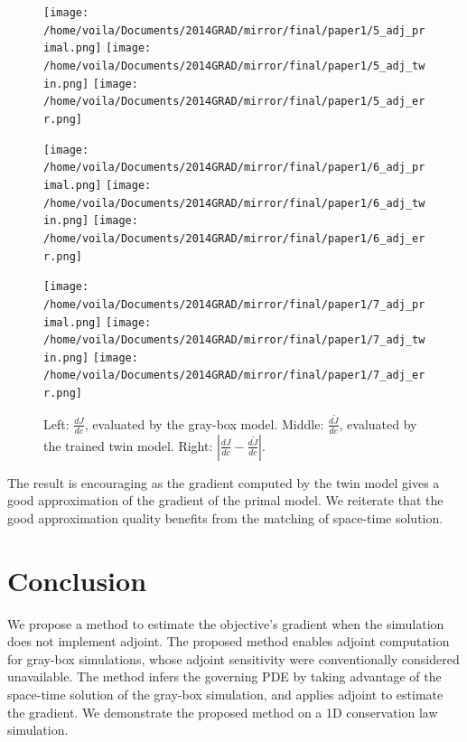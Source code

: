 \documentclass[a4paper,onecolumn]{article}
\theoremstyle{remark}
\begin{document}
\vspace{-1cm}
\begin{figure}[H]\begin{center}
    \texttt{[image: /home/voila/Documents/2014GRAD/mirror/final/paper1/5\_adj\_primal.png]}
    \texttt{[image: /home/voila/Documents/2014GRAD/mirror/final/paper1/5\_adj\_twin.png]}
    \texttt{[image: /home/voila/Documents/2014GRAD/mirror/final/paper1/5\_adj\_err.png]}
    \label{fig:sol compare}
\end{center}\end{figure}
\vspace{-1cm}
\begin{figure}[H]\begin{center}
    \texttt{[image: /home/voila/Documents/2014GRAD/mirror/final/paper1/6\_adj\_primal.png]}
    \texttt{[image: /home/voila/Documents/2014GRAD/mirror/final/paper1/6\_adj\_twin.png]}
    \texttt{[image: /home/voila/Documents/2014GRAD/mirror/final/paper1/6\_adj\_err.png]}
    \label{fig:sol compare}
\end{center}\end{figure}
\vspace{-1cm}
\begin{figure}[H]\begin{center}
    \texttt{[image: /home/voila/Documents/2014GRAD/mirror/final/paper1/7\_adj\_primal.png]}
    \texttt{[image: /home/voila/Documents/2014GRAD/mirror/final/paper1/7\_adj\_twin.png]}
    \texttt{[image: /home/voila/Documents/2014GRAD/mirror/final/paper1/7\_adj\_err.png]}
    \label{fig:sol compare}
    \caption{Left: $\frac{dJ}{dc}$, evaluated by the gray-box model. 
             Middle: $\frac{d\tilde{J}}{dc}$, evaluated by the trained twin model.
             Right: $\left|\frac{dJ}{dc} - \frac{d\tilde{J}}{dc}\right|$.}
\end{center}\end{figure}


The result is encouraging as the gradient computed by the twin model gives a good approximation
of the gradient of the primal model. We reiterate that the good approximation quality benefits from 
the matching of space-time solution.



\section{Conclusion}
We propose a method to estimate the objective's gradient when the simulation does not
implement adjoint. 
The proposed method enables adjoint computation for gray-box simulations, whose adjoint
sensitivity were conventionally considered unavailable.
The method infers the governing PDE by taking advantage of the
space-time solution of the gray-box simulation, and applies adjoint to estimate the gradient.
We demonstrate the proposed method on a 1D conservation law simulation.
\end{document}
